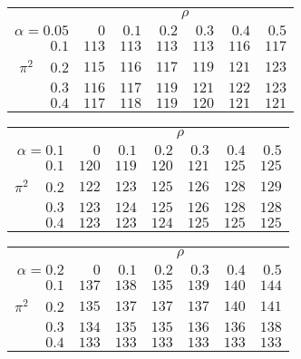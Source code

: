 \begin{tabular}{r|rrrrrr}
\hline\hline
 &\multicolumn{6}{c}{$\rho$} \\ 
 $\alpha = 0.05$ & $0$ & $0.1$ & $0.2$ & $0.3$ & $0.4$ & $0.5$ \\ 
 \hline$0.1$ & $113$ & $113$ & $113$ & $113$ & $116$ & $117$\\ 
$\pi^2\;\;\;$ $0.2$ & $115$ & $116$ & $117$ & $119$ & $121$ & $123$\\ 
$0.3$ & $116$ & $117$ & $119$ & $121$ & $122$ & $123$\\ 
$0.4$ & $117$ & $118$ & $119$ & $120$ & $121$ & $121$\\ 
 \hline 
 \end{tabular}
 
 \vspace{2em} 
 
\begin{tabular}{r|rrrrrr}
\hline\hline
 &\multicolumn{6}{c}{$\rho$} \\ 
 $\alpha = 0.1$ & $0$ & $0.1$ & $0.2$ & $0.3$ & $0.4$ & $0.5$ \\ 
 \hline$0.1$ & $120$ & $119$ & $120$ & $121$ & $125$ & $125$\\ 
$\pi^2\;\;\;$ $0.2$ & $122$ & $123$ & $125$ & $126$ & $128$ & $129$\\ 
$0.3$ & $123$ & $124$ & $125$ & $126$ & $128$ & $128$\\ 
$0.4$ & $123$ & $123$ & $124$ & $125$ & $125$ & $125$\\ 
 \hline 
 \end{tabular}
 
 \vspace{2em} 
 
\begin{tabular}{r|rrrrrr}
\hline\hline
 &\multicolumn{6}{c}{$\rho$} \\ 
 $\alpha = 0.2$ & $0$ & $0.1$ & $0.2$ & $0.3$ & $0.4$ & $0.5$ \\ 
 \hline$0.1$ & $137$ & $138$ & $135$ & $139$ & $140$ & $144$\\ 
$\pi^2\;\;\;$ $0.2$ & $135$ & $137$ & $137$ & $137$ & $140$ & $141$\\ 
$0.3$ & $134$ & $135$ & $135$ & $136$ & $136$ & $138$\\ 
$0.4$ & $133$ & $133$ & $133$ & $133$ & $133$ & $133$\\ 
 \hline 
 \end{tabular}